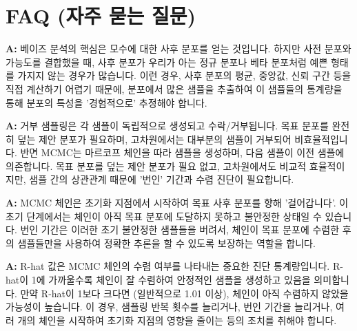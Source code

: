 \documentclass[11pt,a4paper]{article}
\begin{document}
\newpage
\section*{FAQ (자주 묻는 질문)}

\begin{tcolorbox}[mybox={Q: 왜 베이즈 분석에서 사후 분포를 샘플링해야 하나요?}]
\textbf{A:} 베이즈 분석의 핵심은 모수에 대한 사후 분포를 얻는 것입니다. 하지만 사전 분포와 가능도를 결합했을 때, 사후 분포가 우리가 아는 정규 분포나 베타 분포처럼 예쁜 형태를 가지지 않는 경우가 많습니다. 이런 경우, 사후 분포의 평균, 중앙값, 신뢰 구간 등을 직접 계산하기 어렵기 때문에, 분포에서 많은 샘플을 추출하여 이 샘플들의 통계량을 통해 분포의 특성을 '경험적으로' 추정해야 합니다.
\end{tcolorbox}

\begin{tcolorbox}[mybox={Q: 거부 샘플링과 MCMC의 주요 차이점은 무엇인가요?}]
\textbf{A:} 거부 샘플링은 각 샘플이 독립적으로 생성되고 수락/거부됩니다. 목표 분포를 완전히 덮는 제안 분포가 필요하며, 고차원에서는 대부분의 샘플이 거부되어 비효율적입니다. 반면 MCMC는 마르코프 체인을 따라 샘플을 생성하며, 다음 샘플이 이전 샘플에 의존합니다. 목표 분포를 덮는 제안 분포가 필요 없고, 고차원에서도 비교적 효율적이지만, 샘플 간의 상관관계 때문에 '번인' 기간과 수렴 진단이 필요합니다.
\end{tcolorbox}

\begin{tcolorbox}[mybox={Q: MCMC에서 '번인(Burn-in)' 기간은 왜 필요한가요?}]
\textbf{A:} MCMC 체인은 초기화 지점에서 시작하여 목표 사후 분포를 향해 '걸어갑니다'. 이 초기 단계에서는 체인이 아직 목표 분포에 도달하지 못하고 불안정한 상태일 수 있습니다. 번인 기간은 이러한 초기 불안정한 샘플들을 버려서, 체인이 목표 분포에 수렴한 후의 샘플들만을 사용하여 정확한 추론을 할 수 있도록 보장하는 역할을 합니다.
\end{tcolorbox}

\begin{tcolorbox}[mybox={Q: MCMC 결과에서 'R-hat' 값이 1보다 크면 어떻게 해야 하나요?}]
\textbf{A:} R-hat 값은 MCMC 체인의 수렴 여부를 나타내는 중요한 진단 통계량입니다. R-hat이 1에 가까울수록 체인이 잘 수렴하여 안정적인 샘플을 생성하고 있음을 의미합니다. 만약 R-hat이 1보다 크다면 (일반적으로 1.01 이상), 체인이 아직 수렴하지 않았을 가능성이 높습니다. 이 경우, 샘플링 반복 횟수를 늘리거나, 번인 기간을 늘리거나, 여러 개의 체인을 시작하여 초기화 지점의 영향을 줄이는 등의 조치를 취해야 합니다.
\end{tcolorbox}
\end{document}

